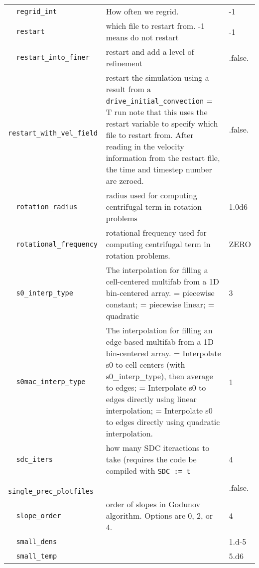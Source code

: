 \begin{landscape}
{\begin{center}
\begin{longtable}{|l|p{5.25in}|l|}
\verb=  regrid_int  = &   How often we regrid.  &  -1 \\
\rowcolor{tableShade}
\verb=  restart  = &   which file to restart from.  -1 means do not restart  &  -1 \\
\verb=  restart_into_finer  = &   restart and add a level of refinement  &  .false. \\
\rowcolor{tableShade}
\verb=  restart_with_vel_field  = &   restart the simulation using a result from a {\tt drive\_initial\_convection} = T run note that this uses the restart variable to specify which file to restart from.  After reading in the velocity information from the restart file, the time and timestep number are zeroed.  &  .false. \\
\verb=  rotation_radius  = &   radius used for computing centrifugal term in rotation problems  &  1.0d6 \\
\rowcolor{tableShade}
\verb=  rotational_frequency  = &   rotational frequency used for computing centrifugal term in rotation problems.  &  ZERO \\
\verb=  s0_interp_type  = &   The interpolation for filling a cell-centered multifab from a 1D bin-centered array. \newline 1 = piecewise constant; \newline 2 = piecewise linear; \newline 3 = quadratic  &  3 \\
\rowcolor{tableShade}
\verb=  s0mac_interp_type  = &   The interpolation for filling an edge based multifab from a 1D bin-centered array. \newline 1 = Interpolate s0 to cell centers (with s0\_interp\_type), then average to edges; \newline 2 = Interpolate s0 to edges directly using linear interpolation; \newline 3 = Interpolate s0 to edges directly using quadratic interpolation.  &  1 \\
\verb=  sdc_iters  = &   how many SDC iteractions to take (requires the code be compiled with {\tt SDC := t}  &  4 \\
\rowcolor{tableShade}
\verb=  single_prec_plotfiles  = &    &  .false. \\
\verb=  slope_order  = &   order of slopes in Godunov algorithm.  Options are 0, 2, or 4.  &  4 \\
\rowcolor{tableShade}
\verb=  small_dens  = &    &  1.d-5 \\
\verb=  small_temp  = &    &  5.d6 \\

\end{longtable}
\end{center}}
\end{landscape}
